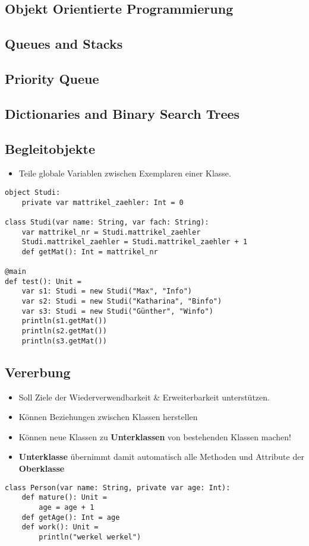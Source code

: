 \subsection{Objekt Orientierte Programmierung}

\subsection{Queues and Stacks}

\subsection{Priority Queue}

\subsection{Dictionaries and Binary Search Trees}

\subsection{Begleitobjekte}
\begin{itemize}
	\item Teile globale Variablen zwischen Exemplaren einer Klasse.
\end{itemize}
\begin{verbatim}
object Studi:
	private var mattrikel_zaehler: Int = 0

class Studi(var name: String, var fach: String):
	var mattrikel_nr = Studi.mattrikel_zaehler
	Studi.mattrikel_zaehler = Studi.mattrikel_zaehler + 1
	def getMat(): Int = mattrikel_nr

@main
def test(): Unit = 
	var s1: Studi = new Studi("Max", "Info")
	var s2: Studi = new Studi("Katharina", "Binfo")
	var s3: Studi = new Studi("Günther", "Winfo")
	println(s1.getMat())
	println(s2.getMat())
	println(s3.getMat())
\end{verbatim}

\subsection{Vererbung}
\begin{itemize}
\item Soll Ziele der Wiederverwendbarkeit \& Erweiterbarkeit unterstützen.
\item Können Beziehungen zwischen Klassen herstellen
\item Können neue Klassen zu \textbf{Unterklassen} von bestehenden Klassen machen!
\item \textbf{Unterklasse} übernimmt damit automatisch alle Methoden und Attribute der \textbf{Oberklasse}
\end{itemize}
\begin{verbatim}
class Person(var name: String, private var age: Int):
	def mature(): Unit = 
		age = age + 1
	def getAge(): Int = age
	def work(): Unit = 
		println("werkel werkel")
\end{verbatim}

